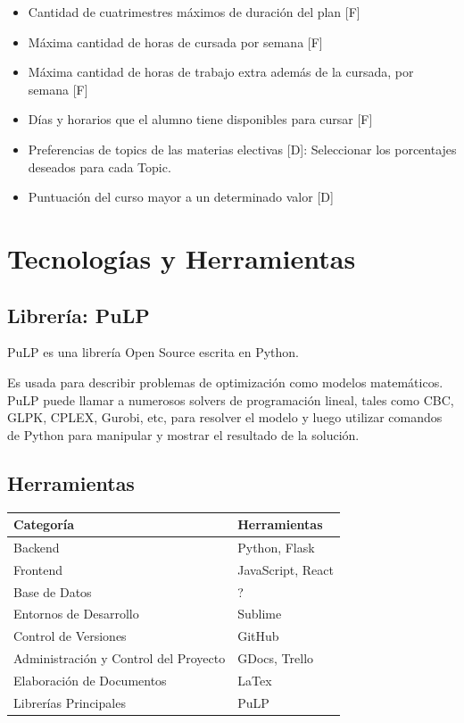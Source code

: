 \documentclass[a4paper]{article}
\begin{document}
\begin{itemize}
	\item Cantidad de cuatrimestres máximos de duración del plan [F]
	\item Máxima cantidad de horas de cursada por semana [F]
	\item Máxima cantidad de horas de trabajo extra además de la cursada, por semana [F]
	\item Días y horarios que el alumno tiene disponibles para cursar [F]
	\item Preferencias de topics de las materias electivas [D]: Seleccionar los porcentajes deseados para cada Topic.
	\item Puntuación del curso mayor a un determinado valor [D]	
\end{itemize}

\section{Tecnologías y Herramientas}

\subsection{Librería: PuLP}

PuLP es una librería Open Source escrita en Python.

Es usada para describir problemas de optimización como modelos matemáticos. PuLP puede llamar a numerosos solvers de programación lineal, tales como CBC, GLPK, CPLEX, Gurobi, etc, para resolver el modelo y luego utilizar comandos de Python para manipular y mostrar el resultado de la solución.

\subsection{Herramientas}

\begin{table}[htbp]
\begin{center}
\begin{tabular}{|l|l|}
\hline
\textbf{Categoría}				 			& 		\textbf{Herramientas} \\
\hline
Backend										&		Python, Flask \\
\hline
Frontend									&		JavaScript, React \\
\hline
Base de Datos			 					&		? \\
\hline
Entornos de Desarrollo						& 		Sublime \\
\hline
Control de Versiones						& 		GitHub \\
\hline
Administración y Control del Proyecto		& 		GDocs, Trello \\
\hline
Elaboración de Documentos					& 		LaTex \\
\hline
Librerías Principales						& 		PuLP \\
\hline
\end{tabular}
\end{center}
\end{table}
\end{document}

